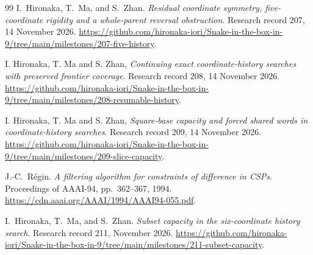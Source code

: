 \documentclass[11pt,a4paper]{article}
\theoremstyle{definition}
\theoremstyle{remark}
\begin{document}
\begin{thebibliography}{99}
I.~Hironaka, T.~Ma, and S.~Zhan. \emph{Residual coordinate symmetry,
five-coordinate rigidity and a whole-parent reversal obstruction}.
Research record 207, 14 November 2026.
\url{https://github.com/hironaka-iori/Snake-in-the-box-in-9/tree/main/milestones/207-five-history}.

I. Hironaka, T. Ma and S. Zhan, \emph{Continuing exact coordinate-history
searches with preserved frontier coverage}. Research record 208,
14 November 2026.
\url{https://github.com/hironaka-iori/Snake-in-the-box-in-9/tree/main/milestones/208-resumable-history}.

I. Hironaka, T. Ma and S. Zhan, \emph{Square-base capacity and forced
shared words in coordinate-history searches}. Research record 209,
14 November 2026.
\url{https://github.com/hironaka-iori/Snake-in-the-box-in-9/tree/main/milestones/209-slice-capacity}.

J.-C.~R\'egin. \emph{A filtering algorithm for constraints of difference
in CSPs}. Proceedings of AAAI-94, pp.~362--367, 1994.
\url{https://cdn.aaai.org/AAAI/1994/AAAI94-055.pdf}.

I.~Hironaka, T.~Ma, and S.~Zhan. \emph{Subset capacity in the
six-coordinate history search}. Research record 211, November 2026.
\url{https://github.com/hironaka-iori/Snake-in-the-box-in-9/tree/main/milestones/211-subset-capacity}.

\end{thebibliography}
\end{document}
